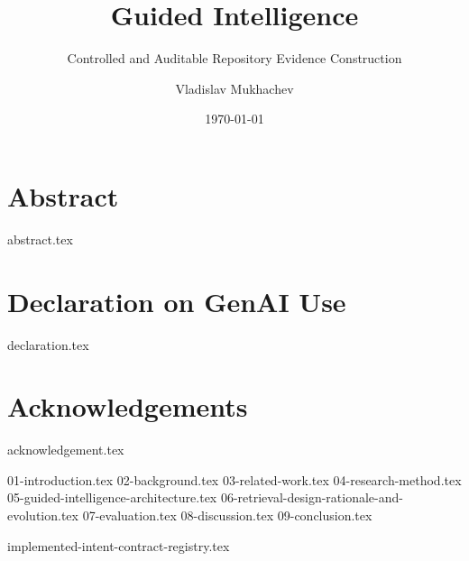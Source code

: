 \documentclass{mscthesis}
\title{Guided Intelligence}
\subtitle{Controlled and Auditable Repository Evidence Construction}
\date{\today}
\author{Vladislav Mukhachev}
\begin{document}
\frontmatter
\makecoverpage
\cleartorecto{}
\makeformaltitlepages

\cleartorecto{}
\chapter{Abstract}
{abstract.tex}
\glsresetall{}

\cleartorecto{}
\chapter{Declaration on GenAI Use}
{declaration.tex}
\clearpage{}

\cleartorecto{}
\tableofcontents{}
\clearpage{}
\listoffigures{}
\clearpage{}
\listoftables{}
\clearpage{}

\cleartorecto{}
\chapter{Acknowledgements}
{acknowledgement.tex}

\mainmatter
{01-introduction.tex}
{02-background.tex}
{03-related-work.tex}
{04-research-method.tex}
{05-guided-intelligence-architecture.tex}
{06-retrieval-design-rationale-and-evolution.tex}
{07-evaluation.tex}
{08-discussion.tex}
{09-conclusion.tex}

\appendix
{implemented-intent-contract-registry.tex}

\backmatter
\printbibliography{}
\cleardoublepage{}
\printacronyms[style=long,title={Acronyms}]
\cleardoublepage{}
\end{document}
